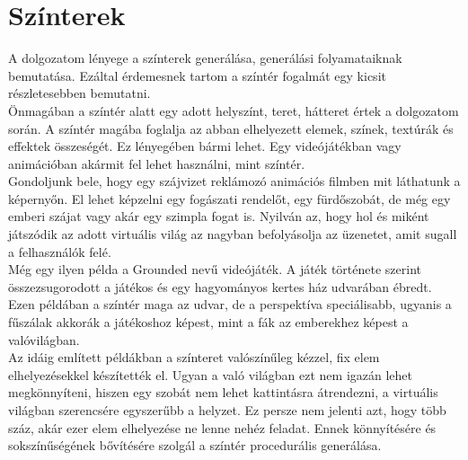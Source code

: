 \chapter{Színterek}
A dolgozatom lényege a színterek generálása, generálási folyamataiknak bemutatása. Ezáltal
érdemesnek tartom a színtér fogalmát egy kicsit részletesebben bemutatni.\\
Önmagában a színtér alatt egy adott helyszínt, teret, hátteret értek a dolgozatom során. A színtér
magába foglalja az abban elhelyezett elemek, színek, textúrák és effektek összeségét. Ez lényegében
bármi lehet. Egy videójátékban vagy animációban akármit fel lehet használni, mint színtér.\\
Gondoljunk bele, hogy egy szájvizet reklámozó animációs filmben mit láthatunk a képernyőn. El lehet
képzelni egy fogászati rendelőt, egy fürdőszobát, de még egy emberi szájat vagy akár egy szimpla
fogat is. Nyilván az, hogy hol és miként játszódik az adott virtuális világ az nagyban befolyásolja az üzenetet, amit sugall a felhasználók felé.\\
Még egy ilyen példa a Grounded nevű videójáték. A játék
története szerint összezsugorodott a játékos és egy hagyományos kertes ház udvarában ébredt. Ezen
példában a színtér maga az udvar, de a perspektíva speciálisabb, ugyanis a fűszálak akkorák a
játékoshoz képest, mint a fák az emberekhez képest a valóvilágban.\\
Az idáig említett példákban a színteret valószínűleg kézzel, fix elem elhelyezésekkel készítették el.
Ugyan a való világban ezt nem igazán lehet megkönnyíteni, hiszen egy szobát nem lehet kattintásra
átrendezni, a virtuális világban szerencsére egyszerűbb a helyzet. Ez persze nem jelenti azt, hogy több
száz, akár ezer elem elhelyezése ne lenne nehéz feladat. Ennek könnyítésére és sokszínűségének
bővítésére szolgál a színtér procedurális generálása.

